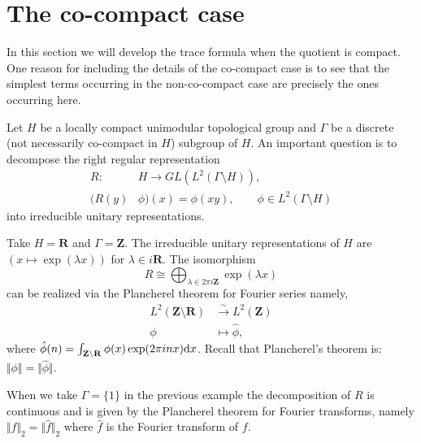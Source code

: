 \documentclass{ims9x6}
\def\R{\mathbf R}
\def\Z{\mathbf Z}
\def\d{\text d}
\def\bs{\setminus}
\def\Ltwo{L^2}
\def\norm#1{\Vert #1 \Vert} %
\begin{document}
\section{The co-compact case} \label{sec_cpt}

In this section we will develop the trace formula when the quotient is compact. One reason for including the details of the co-compact case is to see that the simplest terms occurring in the non-co-compact case are precisely the ones occurring here. 

Let $H$ be a locally compact unimodular topological group and $\Gamma$ be a discrete (not necessarily co-compact in $H$) subgroup of $H$. An important question is to decompose the right regular representation 
\begin{align*}
	R : & H \to GL(\Ltwo(\Gamma \bs H)), \\
	(R(y) & \phi)(x) = \phi(xy), \qquad \phi \in \Ltwo(\Gamma\bs H)
\end{align*}
into irreducible unitary representations. 
\begin{example}
	Take $H = \R$ and $\Gamma = \Z$. The irreducible unitary representations of $H$ are $(x \mapsto \exp(\lambda x)) $ for $\lambda \in i\R.$ The isomorphism 
	\[ R \cong \displaystyle\bigoplus_{\lambda \in 2\pi i \Z} \exp(\lambda x) \]
	can be realized via the Plancherel theorem for Fourier series namely,
	\begin{align*}
		\Ltwo(\Z \bs \R) & \overset{\sim}{\longrightarrow} \Ltwo(\Z) \\
		\phi & \mapsto \hat\phi,
	\end{align*}
	where $\hat\phi(n) = \int_{\Z\bs \R} \phi(x) \exp(2\pi i n x) \d x$. Recall that Plancherel's theorem is: $\norm{\phi} = \norm{\hat\phi}$. 
\end{example}
\begin{example}
	When we take $\Gamma = \{1\}$ in the previous example the decomposition of $R$ is continuous and is given by the Plancherel theorem for Fourier transforms, namely $\norm{f}_2 = \norm{\hat f}_2$ where $\hat f$ is the Fourier transform of $f$. 
\end{example}
\end{document}
